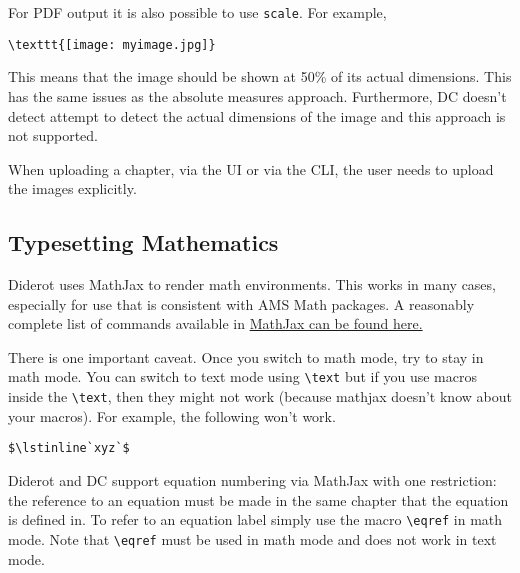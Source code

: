 \begin{important}
For PDF output it is also possible to use \lstinline`scale`.  For example,
\begin{lstlisting}
\texttt{[image: myimage.jpg]}
\end{lstlisting}

This means that the image should be shown at 50\% of its actual dimensions.  This has  the same issues as the absolute measures approach. Furthermore, DC doesn't detect attempt to detect the actual dimensions of the image and this approach is not supported.
\end{important}

\begin{gram}
When uploading a chapter, via the UI or via the CLI, the user needs to upload the images explicitly.   
\end{gram}

\subsection{Typesetting Mathematics}
\label{sec:dc::typesetting-mathematics}

Diderot uses MathJax to render math environments.  This works in many cases, especially for use that is consistent with AMS Math packages.  
%
A reasonably complete list of commands available in 
\href{http://www.onemathematicalcat.org/MathJaxDocumentation/TeXSyntax.htm#alphaList}{MathJax can be found here.}
%

There is one important caveat. 
%
Once you switch to math mode, try to stay in math mode.  You can switch to text mode using \lstinline`\text` but if you use macros inside  the \lstinline`\text`, then they might not work (because mathjax doesn't know about your macros).  For example, the following won't work. 
\begin{lstlisting}
$\lstinline`xyz`$
\end{lstlisting}



Diderot and DC support equation numbering via MathJax with one restriction: the reference to an equation must be made in the same chapter that the equation is defined in.
%
To refer to an equation label simply use the macro \lstinline`\eqref` in math mode.  Note that \lstinline`\eqref` must be used in math mode and does not work in text mode.

